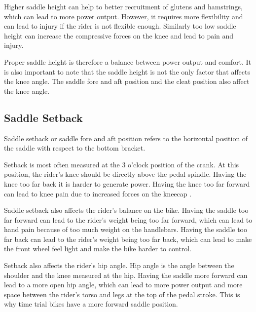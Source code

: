 Higher saddle height can help to better recruitment of glutens and hamstrings, which can lead to more power output. However, it requires more flexibility and can lead to injury if the rider is not flexible enough. Similarly too low saddle height can increase the compressive forces on the knee and lead to pain and injury.

Proper saddle height is therefore a balance between power output and comfort. It is also important to note that the saddle height is not the only factor that affects the knee angle. The saddle fore and aft position and the cleat position also affect the knee angle.

\subsection{Saddle Setback}
Saddle setback or saddle fore and aft position refers to the horizontal position of the saddle with respect to the bottom bracket.


Setback is most often measured at the 3 o'clock position of the crank. At this position, the rider's knee should be directly above the pedal spindle. Having the knee too far back it is harder to generate power. Having the knee too far forward can lead to knee pain due to increased forces on the kneecap \cite{burtbikefit}.

Saddle setback also affects the rider's balance on the bike. Having the saddle too far forward can lead to the rider's weight being too far forward, which can lead to hand pain because of too much weight on the handlebars. Having the saddle too far back can lead to the rider's weight being too far back, which can lead to make the front wheel feel light and make the bike harder to control.

Setback also affects the rider's hip angle. Hip angle is the angle between the shoulder and the knee measured at the hip. Having the saddle more forward can lead to a more open hip angle, which can lead to more power output and more space between the rider's torso and legs at the top of the pedal stroke. This is why time trial bikes have a more forward saddle position.



